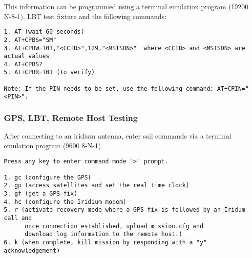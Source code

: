 This information can be programmed using a terminal emulation program (19200 N-8-1),
LBT test fixture and the following commands:
 
\begin{verbatim}
1. AT (wait 60 seconds)
2. AT+CPBS="SM"
3. AT+CPBW=101,"<CCID>",129,"<MSISDN>"  where <CCID> and <MSISDN> are actual values
4. AT+CPBS? 
5. AT+CPBR=101 (to verify)

Note: If the PIN needs to be set, use the following command: AT+CPIN="<PIN>".
\end{verbatim}

\subsubsection{GPS, LBT, Remote Host Testing}

After connecting to an iridium antenna, enter sail commands via a terminal emulation
program (9600 8-N-1).  

\begin{verbatim}
Press any key to enter command mode ">" prompt.

1. gc (configure the GPS)
2. gp (access satellites and set the real time clock)
3. gf (get a GPS fix)
4. hc (configure the Iridium modem)
5. r (activate recovery mode where a GPS fix is followed by an Iridum call and 
      once connection established, upload mission.cfg and 
      download log information to the remote host.)
6. k (when complete, kill mission by responding with a "y" acknowledgement)
\end{verbatim}

